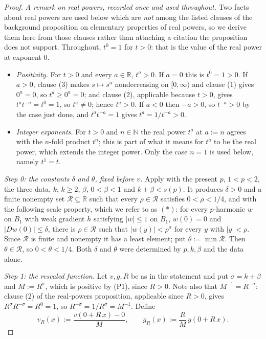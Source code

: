 \begin{proof}
\medskip\noindent\emph{A remark on real powers, recorded once and used throughout.}  Two facts
about real powers are used below which are \emph{not} among the listed clauses of the background
proposition on elementary properties of real powers, so we derive them here from those clauses
rather than attaching a citation the proposition does not support.  Throughout, $t^{0}=1$ for
$t>0$: that is the value of the real power at exponent $0$.
\begin{itemize}
\item[(P1)] \emph{Positivity.}  For $t>0$ and every $a\in\mathbb{R}$, $t^{a}>0$.  If $a=0$ this
is $t^{0}=1>0$.  If $a>0$, clause (3) makes $s\mapsto s^{a}$ nondecreasing on $[0,\infty)$ and
clause (1) gives $0^{a}=0$, so $t^{a}\ge0^{a}=0$; and clause (2), applicable because $t>0$,
gives $t^{a}t^{-a}=t^{0}=1$, so $t^{a}\ne0$; hence $t^{a}>0$.  If $a<0$ then $-a>0$, so
$t^{-a}>0$ by the case just done, and $t^{a}t^{-a}=1$ gives $t^{a}=1/t^{-a}>0$.
\item[(P2)] \emph{Integer exponents.}  For $t>0$ and $n\in\mathbb{N}$ the real power $t^{a}$ at
$a:=n$ agrees with the $n$-fold product $t^{n}$; this is part of what it means for $t^{a}$ to be
the real power, which extends the integer power.  Only the case $n=1$ is used below, namely
$t^{1}=t$.
\end{itemize}

\emph{Step 0: the constants $\delta$ and $\theta$, fixed before $v$.}
Apply  with the present $p$, $1<p<2$, the three data, $k$, $k\ge2$, $\beta$,
$0<\beta<1$ and $k+\beta<s(p)$.  It produces $\delta>0$ and a finite nonempty set
$\mathcal{R}\subseteq\mathbb{R}$ such that every $\rho\in\mathcal{R}$ satisfies
$0<\rho<1/4$, and with the following scale property, which we refer to as $(\ast)$: for every
$p$-harmonic $w$ on $B_1$ with weak gradient $h$ satisfying $\lvert w\rvert\le1$ on $B_1$,
$w(0)=0$ and $\lvert Dw(0)\rvert\le\delta$, there is $\rho\in\mathcal{R}$ such that
$\lvert w(y)\rvert<\rho^{\sigma}$ for every $y$ with $\lvert y\rvert<\rho$.
Since $\mathcal{R}$ is finite and nonempty it has a least element; put $\theta:=\min\mathcal{R}$.
Then $\theta\in\mathcal{R}$, so $0<\theta<1/4$.  Both $\delta$ and $\theta$ were determined by
$p,k,\beta$ and the data alone.

\emph{Step 1: the rescaled function.}  Let $v,g,R$ be as in the statement and put
$\sigma=k+\beta$ and $M:=R^{\sigma}$, which is positive by (P1), since $R>0$.  Note also that
$M^{-1}=R^{-\sigma}$: clause (2) of the real-powers proposition, applicable since $R>0$, gives
$R^{\sigma}R^{-\sigma}=R^{0}=1$, so $R^{-\sigma}=1/R^{\sigma}=M^{-1}$.
Define
\[
  v_R(x):=\frac{v(0+R\,x)-0}{M},\qquad g_R(x):=\frac{R}{M}\,g(0+R\,x).
\]


\end{proof}
